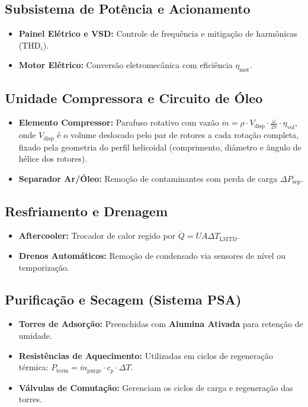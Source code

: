\documentclass[12pt,a4paper]{article}
\numberwithin{equation}{section}
\numberwithin{table}{section}
\numberwithin{figure}{section}
\begin{document}
	\subsection{\textbf{Subsistema de Potência e Acionamento}}
	\begin{itemize}
		\item \textbf{Painel Elétrico e VSD:} Controle de frequência e mitigação de harmônicas ($\text{THD}_i$).
		\item \textbf{Motor Elétrico:} Conversão eletromecânica com eficiência $\eta_{\text{mot}}$.
	\end{itemize}
	
	\subsection{\textbf{Unidade Compressora e Circuito de Óleo}}
	\begin{itemize}
		\item \textbf{Elemento Compressor:} Parafuso rotativo com vazão $\dot{m} = \rho \cdot V_{\text{disp}} \cdot \frac{\omega}{2\pi} \cdot \eta_{\text{vol}}$, onde $V_{\text{disp}}$ é o volume deslocado pelo par de rotores a cada rotação completa, fixado pela geometria do perfil helicoidal (comprimento, diâmetro e ângulo de hélice dos rotores).
		\item \textbf{Separador Ar/Óleo:} Remoção de contaminantes com perda de carga $\Delta P_{\text{sep}}$.
	\end{itemize}
	
	\subsection{\textbf{Resfriamento e Drenagem}}
	\begin{itemize}
		\item \textbf{Aftercooler:} Trocador de calor regido por $\dot{Q} = U A \Delta T_{\text{LMTD}}$.
		\item \textbf{Drenos Automáticos:} Remoção de condensado via sensores de nível ou temporização.
	\end{itemize}
	
	\subsection{\textbf{Purificação e Secagem (Sistema PSA)}}
	\begin{itemize}
		\item \textbf{Torres de Adsorção:} Preenchidas com \textbf{Alumina Ativada} para retenção de umidade.
		\item \textbf{Resistências de Aquecimento:} Utilizadas em ciclos de regeneração térmica: $P_{\text{term}} = \dot{m}_{\text{purge}} \cdot c_p \cdot \Delta T$.
		\item \textbf{Válvulas de Comutação:} Gerenciam os ciclos de carga e regeneração das torres.
	\end{itemize}
	
\end{document}
